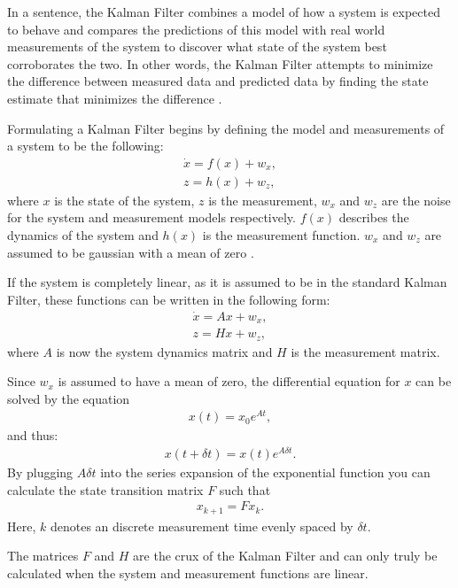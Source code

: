 In a sentence, the Kalman Filter combines a model of how a system is expected to behave and compares the predictions of this model with real world measurements of the system to discover what state of the system best corroborates the two. In other words, the Kalman Filter attempts to minimize the difference between measured data and predicted data by finding the state estimate that minimizes the difference \cite{kf_derivation}.

Formulating a Kalman Filter begins by defining the model and measurements of a system to be the following:
\begin{align}\label{system_functions}
\dot{x} = f(x) + w_x, \\
z = h(x) + w_z,
\end{align}
where $x$ is the state of the system, $z$ is the measurement, $w_x$ and $w_z$ are the noise for the system and measurement models respectively. $f(x)$ describes the dynamics of the system and $h(x)$ is the measurement function. $w_x$ and $w_z$ are assumed to be gaussian with a mean of zero \cite{kf_derivation}. 

If the system is completely linear, as it is assumed to be in the standard Kalman Filter, these functions can be written in the following form:
\begin{align}\label{linear_systems}
\dot{x} = Ax + w_x, \\
z = Hx + w_z,
\end{align}
where $A$ is now the system dynamics matrix and $H$ is the measurement matrix.

Since $w_x$ is assumed to have a mean of zero, the differential equation for $x$ can be solved by the equation
\begin{align}
x(t) = x_0e^{At},
\end{align}
and thus:
\begin{align}
x(t + \delta t) = x(t)e^{A\delta t}.
\end{align}
By plugging $A\delta t$ into the series expansion of the exponential function you can calculate the state transition matrix $F$ such that
\begin{align}\label{predict_step}
x_{k+1} = Fx_{k}.
\end{align}
Here, $k$ denotes an discrete measurement time evenly spaced by $\delta t$.

The matrices $F$ and $H$ are the crux of the Kalman Filter and can only truly be calculated when the system and measurement functions are linear. 

